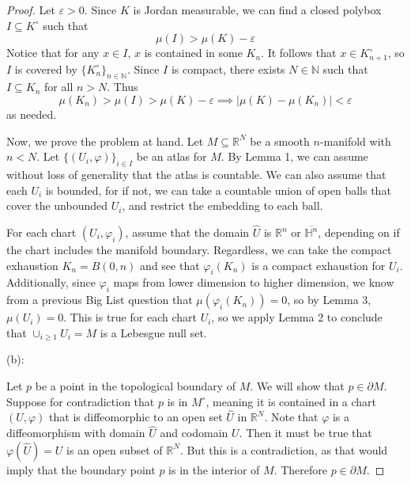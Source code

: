 \documentclass{article}
\theoremstyle{plain} %
\numberwithin{thm}{section} %
\theoremstyle{definition}
\begin{document}
\begin{proof}
            Let \(\varepsilon > 0\). Since \(K\) is Jordan measurable, we can find a closed polybox \(I \subseteq K^\circ\) such that
            \[
                \mu (I) > \mu (K) - \varepsilon
            \]
            Notice that for any \(x \in I\), \(x\) is contained in some \(K_n\). It follows that \(x \in K_{n+1} ^\circ\), so \(I\) is covered by \(\{ K_n ^\circ\} _{n \in \mathbb{N}}\). Since \(I\) is compact, there exists \(N \in \mathbb{N}\) such that \(I \subseteq K_n\) for all \(n > N\). Thus
            \[
                \mu (K_n) > \mu (I) > \mu (K) - \varepsilon \implies |\mu (K) - \mu (K_n)| < \varepsilon
            \]
            as needed.

            \medskip

            Now, we prove the problem at hand. Let \(M \subseteq \mathbb{R}^N\) be a smooth \(n\)-manifold with \(n < N\). Let \(\{ (U_i, \varphi)\}_{i \in I}\) be an atlas for \(M\). By Lemma 1, we can assume without loss of generality that the atlas is countable. We can also assume that each \(U_i\) is bounded, for if not, we can take a countable union of open balls that cover the unbounded \(U_i\), and restrict the embedding to each ball.

            For each chart \((U_i, \varphi_i)\), assume that the domain \(\hat{U}\) is \(\mathbb{R}^n\) or \(\overline{\mathbb{H}^n}\), depending on if the chart includes the manifold boundary. Regardless, we can take the compact exhaustion \(K_n = B(0, n)\) and see that \(\varphi _i (K_n)\) is a compact exhaustion for \(U_i\). Additionally, since \(\varphi _i\) maps from lower dimension to higher dimension, we know from a previous Big List question that \(\mu (\varphi _i (K_n))=0\), so by Lemma 3, \(\mu (U_i) = 0\). This is true for each chart \(U_i\), so we apply Lemma 2 to conclude that \(\cup _{i \geq 1} U_i = M\) is a Lebesgue null set.

            \medskip

            (b):

            Let \(p\) be a point in the topological boundary of \(M\). We will show that \(p \in \partial M\). Suppose for contradiction that \(p\) is in \(M^\circ\), meaning it is contained in a chart \((U, \varphi)\) that is diffeomorphic to an open set \(\hat{U}\) in \(\mathbb{R}^N\). Note that \(\varphi\) is a diffeomorphism with domain \(\hat{U}\) and codomain \(U\). Then it must be true that \(\varphi (\hat{U}) = U\) is an open subset of \(\mathbb{R}^N\). But this is a contradiction, as that would imply that the boundary point \(p\) is in the interior of \(M\). Therefore \(p \in \partial M\).


\end{proof}
\end{document}
